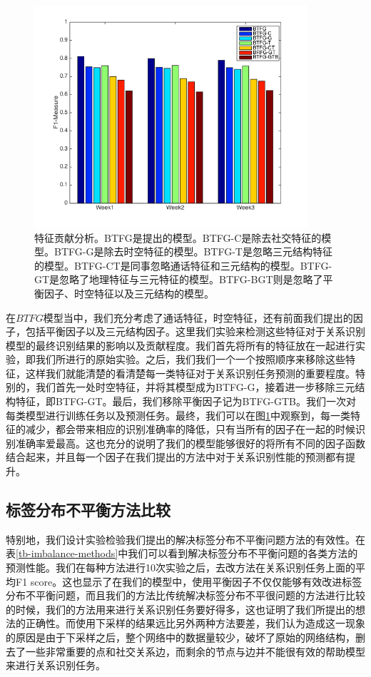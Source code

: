 \begin{figure}[!ht]
    \centering
    \includegraphics[scale=1, width=0.9\textwidth]{figure/fcanalysis.png}
    \caption{特征贡献分析。BTFG是提出的模型。BTFG-C是除去社交特征的模型。BTFG-G是除去时空特征的模型。BTFG-T是忽略三元结构特征的模型。BTFG-CT是同事忽略通话特征和三元结构的模型。BTFG-GT是忽略了地理特征与三元特征的模型。BTFG-BGT则是忽略了平衡因子、时空特征以及三元结构的模型。}
    \label{fig-factor-contribution-analysis}
\end{figure}


在$BTFG$模型当中，我们充分考虑了通话特征，时空特征，还有前面我们提出的因子，包括平衡因子以及三元结构因子。这里我们实验来检测这些特征对于关系识别模型的最终识别结果的影响以及贡献程度。我们首先将所有的特征放在一起进行实验，即我们所进行的原始实验。之后，我们我们一个一个按照顺序来移除这些特征，这样我们就能清楚的看清楚每一类特征对于关系识别任务预测的重要程度。特别的，我们首先一处时空特征，并将其模型成为BTFG-G，接着进一步移除三元结构特征，即BTFG-GT。最后，我们移除平衡因子记为BTFG-GTB。我们一次对每类模型进行训练任务以及预测任务。最终，我们可以在图\ref{fig-factor-contribution-analysis}中观察到，每一类特征的减少，都会带来相应的识别准确率的降低，只有当所有的因子在一起的时候识别准确率爱最高。这也充分的说明了我们的模型能够很好的将所有不同的因子函数结合起来，并且每一个因子在我们提出的方法中对于关系识别性能的预测都有提升。

\subsection{标签分布不平衡方法比较}

特别地，我们设计实验检验我们提出的解决标签分布不平衡问题方法的有效性。在表\ref{tb-imbalance-methods}中我们可以看到解决标签分布不平衡问题的各类方法的预测性能。我们在每种方法进行10次实验之后，去改方法在关系识别任务上面的平均F1 score。这也显示了在我们的模型中，使用平衡因子不仅仅能够有效改进标签分布不平衡问题，而且我们的方法比传统解决标签分布不平很问题的方法进行比较的时候，我们的方法用来进行关系识别任务要好得多，这也证明了我们所提出的想法的正确性。而使用下采样的结果远比另外两种方法要差，我们认为造成这一现象的原因是由于下采样之后，整个网络中的数据量较少，破坏了原始的网络结构，删去了一些非常重要的点和社交关系边，而剩余的节点与边并不能很有效的帮助模型来进行关系识别任务。


